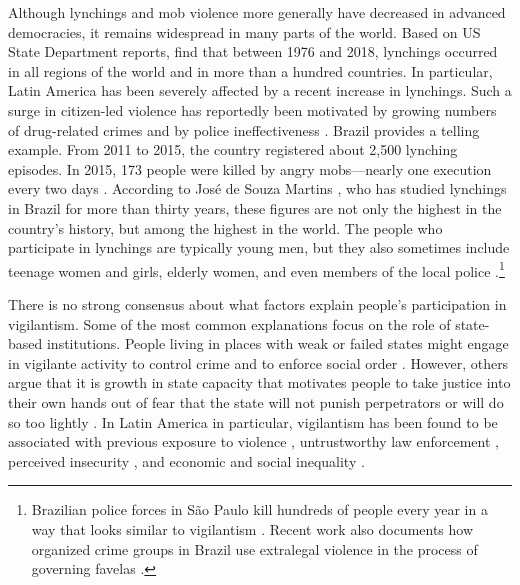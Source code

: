 \documentclass[12pt,ansiapaper]{article}
\begin{document}
Although lynchings and mob violence more generally have decreased in advanced democracies, it remains widespread in many parts of the world. Based on US State Department reports, \citet[33]{jung2020lynching} find that between 1976 and 2018, lynchings occurred in all regions of the world and in more than a hundred countries. In particular, Latin America has been severely affected by a recent increase in lynchings. Such a surge in citizen-led violence has reportedly been motivated by growing numbers of drug-related crimes and by police ineffectiveness \citep{mallen2014vigilantes}. Brazil provides a telling example. From 2011 to 2015, the country registered about 2,500 lynching episodes. In 2015, 173 people were killed by angry mobs---nearly one execution every two days \citep{barbara2015vigilantes, oliveira2016mob}. According to José de Souza Martins \citeyearpar{martins2015linchamentos}, who has studied lynchings in Brazil for more than thirty years, these figures are not only the highest in the country's history, but among the highest in the world. The people who participate in lynchings are typically  young men, but they also sometimes include teenage women and girls, elderly women, and even members of the local police \citep{moura2017linchamentos}.\footnote{Brazilian police forces in São Paulo kill hundreds of people every year in a way that looks similar to vigilantism \citep{willis2015killing}. Recent work also documents how organized crime groups in Brazil use extralegal violence in the process of governing favelas  \citep{magaloni2020killing}.}

There is no strong consensus about what factors explain people's participation in vigilantism. Some of the most common explanations focus on the role of state-based institutions. People living in places with weak or failed states might engage in vigilante activity to control crime and to enforce social order \citep{bancroft1887works}. However, others argue that it is growth in state capacity that motivates people to take justice into their own hands out of fear that the state will not punish perpetrators or will do so too lightly \citep{smith2019contradictions}. In Latin America in particular, vigilantism has been found to be associated with previous exposure to violence \citep{garcia2019anger}, untrustworthy law enforcement \citep{zizumbo2017community}, perceived insecurity \citep{ceobanu2011crime, godoy2004justice}, and economic and social inequality \citep{phillips2017inequality,godoy2006popular,arias2010violent}.
\end{document}
